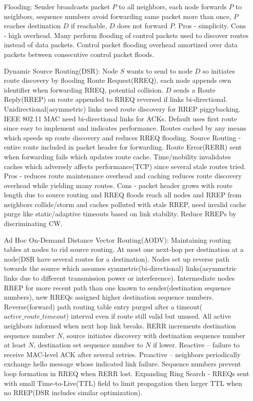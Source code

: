 \documentclass[9pt]{extarticle}
\begin{document}
\begin{multicols}{2}
Flooding: Sender broadcasts packet $P$ to all neighbors, each node forwards $P$ to neighbors, sequence numbers avoid forwarding same packet more than once, $P$ reaches destination $D$ if reachable, $D$ does not forward  $P$. Pros - simplicity. Cons - high overhead. Many perform flooding of control packets used to discover routes instead of data packets. Control packet flooding overhead amortized over data packets between consecutive control packet floods.

Dynamic Source Routing(DSR): Node $S$ wants to send to node $D$ so initiates route discovery by flooding Route Request(RREQ), each node appends own identifier when forwarding RREQ, potential collision. $D$ sends a Route Reply(RREP) on route appended to RREQ reversed if links bi-directional. Unidirectional(asymmetric) links need route discovery for RREP piggybacking. IEEE 802.11 MAC need bi-directional links for ACKs. Default uses first route since easy to implement and indicates performance. Routes cached by any means which speeds up route discovery and reduces RREQ flooding. Source Routing - entire route included in packet header for forwarding. Route Error(RERR) sent when forwarding fails which updates route cache. Time/mobility invalidates caches which adversely affects performance(TCP) since several stale routes tried. Pros - reduces route maintenance overhead and caching reduces route discovery overhead while yielding many routes. Cons - packet header grows with route length due to source routing and RREQ floods reach all nodes and RREP from neighbors collide/storm and caches polluted with stale RREP, need invalid cache purge like static/adaptive timeouts based on link stability. Reduce RREPs by discriminating CW.

Ad Hoc On-Demand Distance Vector Routing(AODV): Maintaining routing tables at nodes to rid source routing. At most one next-hop per destination at a node(DSR have several routes for a destination). Nodes set up reverse path towards the source which assumes symmetric(bi-directional) links(asymmetric links due to different transmission power or interference). Intermediate nodes RREP for more recent path than one known to sender(destination sequence numbers), new RREQs assigned higher destination sequence numbers. Reverse(forward) path routing table entry purged after a timeout($active\_route\_timeout$) interval even if route still valid but unused. All active neighbors informed when next hop link breaks. RERR increments destination sequence number $N$, source initiates discovery with destination sequence number at least $N$, destination set sequence number to $N$ if lower. Reactive – failure to receive MAC-level ACK after several retries. Proactive – neighbors periodically exchange hello message whose indicated link failure. Sequence numbers prevent loop formation in RREQ when RERR lost. Expanding Ring Search - RREQs sent with small Time-to-Live(TTL) field to limit propagation then larger TTL when no RREP(DSR includes similar optimization).


\end{multicols}
\end{document}
